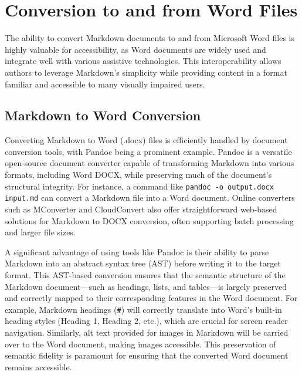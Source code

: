\section{Conversion to and from Word Files}
\label{sec:markdown-word}

The ability to convert Markdown documents to and from Microsoft Word files is highly valuable for accessibility, as Word documents are widely used and integrate well with various assistive technologies. This interoperability allows authors to leverage Markdown's simplicity while providing content in a format familiar and accessible to many visually impaired users.

\subsection{Markdown to Word Conversion}
Converting Markdown to Word (.docx) files is efficiently handled by document conversion tools, with Pandoc being a prominent example. \cite{AllThingsOpenPandoc, PandocManual} Pandoc is a versatile open-source document converter capable of transforming Markdown into various formats, including Word DOCX, while preserving much of the document's structural integrity. \cite{AllThingsOpenPandoc, PandocManual} For instance, a command like \texttt{pandoc -o output.docx input.md} can convert a Markdown file into a Word document. \cite{AllThingsOpenPandoc} Online converters such as MConverter and CloudConvert also offer straightforward web-based solutions for Markdown to DOCX conversion, often supporting batch processing and larger file sizes. \cite{MConverter, CloudConvert}

A significant advantage of using tools like Pandoc is their ability to parse Markdown into an abstract syntax tree (AST) before writing it to the target format. \cite{PandocLuaFilters, PandocManual} This AST-based conversion ensures that the semantic structure of the Markdown document---such as headings, lists, and tables---is largely preserved and correctly mapped to their corresponding features in the Word document. \cite{PandocLuaFilters, PandocManual} For example, Markdown headings (\texttt{\#}) will correctly translate into Word's built-in heading styles (Heading 1, Heading 2, etc.), which are crucial for screen reader navigation. \cite{DSU, CreateUW} Similarly, alt text provided for images in Markdown will be carried over to the Word document, making images accessible. \cite{PandocLuaFilters} This preservation of semantic fidelity is paramount for ensuring that the converted Word document remains accessible.

